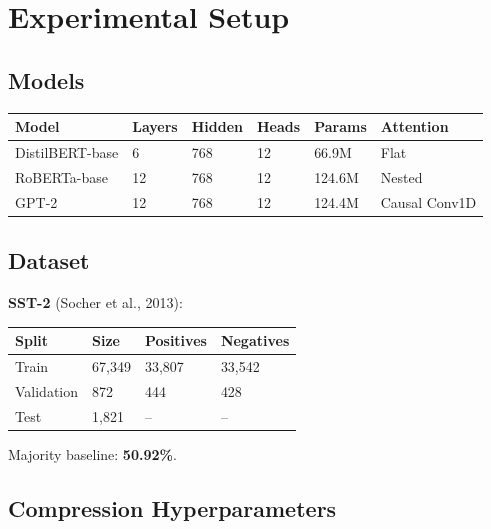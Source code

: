 
\section{Experimental Setup}

\subsection{Models}

\begin{table}[H]
\centering
\small
\begin{tabular}{llllll}
\toprule
\textbf{Model} & \textbf{Layers} & \textbf{Hidden} & \textbf{Heads} & \textbf{Params} & \textbf{Attention} \\
\midrule
DistilBERT-base & 6 & 768 & 12 & 66.9M & Flat \\
RoBERTa-base & 12 & 768 & 12 & 124.6M & Nested \\
GPT-2 & 12 & 768 & 12 & 124.4M & Causal Conv1D \\
\bottomrule
\end{tabular}
\end{table}

\subsection{Dataset}

\textbf{SST-2} (Socher et al., 2013):

\begin{table}[H]
\centering
\small
\begin{tabular}{llll}
\toprule
\textbf{Split} & \textbf{Size} & \textbf{Positives} & \textbf{Negatives} \\
\midrule
Train & 67,349 & 33,807 & 33,542 \\
Validation & 872 & 444 & 428 \\
Test & 1,821 & -- & -- \\
\bottomrule
\end{tabular}
\end{table}

Majority baseline: \textbf{50.92\%}.

\subsection{Compression Hyperparameters}


